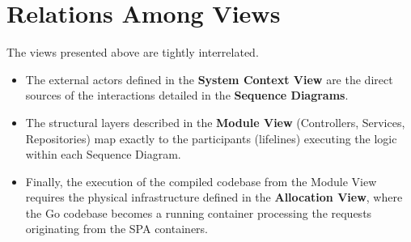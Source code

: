 \documentclass{scrreprt}
\begin{document}
\chapter{Relations Among Views}
The views presented above are tightly interrelated. 
\begin{itemize}
    \item The external actors defined in the \textbf{System Context View} are the direct sources of the interactions detailed in the \textbf{Sequence Diagrams}.
    \item The structural layers described in the \textbf{Module View} (Controllers, Services, Repositories) map exactly to the participants (lifelines) executing the logic within each Sequence Diagram.
    \item Finally, the execution of the compiled codebase from the Module View requires the physical infrastructure defined in the \textbf{Allocation View}, where the Go codebase becomes a running container processing the requests originating from the SPA containers.
\end{itemize}
\end{document}
